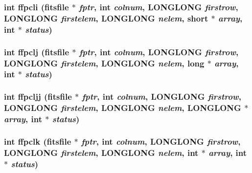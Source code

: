 \subsubsection{\setlength{\rightskip}{0pt plus 5cm}int ffpcli (\bf{fitsfile} $\ast$ {\em fptr}, int {\em colnum}, \bf{LONGLONG} {\em firstrow}, \bf{LONGLONG} {\em firstelem}, \bf{LONGLONG} {\em nelem}, short $\ast$ {\em array}, int $\ast$ {\em status})}\label{test_2shm__client_2fitsio_8h_097003985cb9d02ceced5a5744bfa0fc}


\subsubsection{\setlength{\rightskip}{0pt plus 5cm}int ffpclj (\bf{fitsfile} $\ast$ {\em fptr}, int {\em colnum}, \bf{LONGLONG} {\em firstrow}, \bf{LONGLONG} {\em firstelem}, \bf{LONGLONG} {\em nelem}, long $\ast$ {\em array}, int $\ast$ {\em status})}\label{test_2shm__client_2fitsio_8h_5792d2cdff6869df24d96769d29588bb}


\subsubsection{\setlength{\rightskip}{0pt plus 5cm}int ffpcljj (\bf{fitsfile} $\ast$ {\em fptr}, int {\em colnum}, \bf{LONGLONG} {\em firstrow}, \bf{LONGLONG} {\em firstelem}, \bf{LONGLONG} {\em nelem}, \bf{LONGLONG} $\ast$ {\em array}, int $\ast$ {\em status})}\label{test_2shm__client_2fitsio_8h_65ee3dc7c6f9893ec471ba73d3a9779d}


\subsubsection{\setlength{\rightskip}{0pt plus 5cm}int ffpclk (\bf{fitsfile} $\ast$ {\em fptr}, int {\em colnum}, \bf{LONGLONG} {\em firstrow}, \bf{LONGLONG} {\em firstelem}, \bf{LONGLONG} {\em nelem}, int $\ast$ {\em array}, int $\ast$ {\em status})}\label{test_2shm__client_2fitsio_8h_d4e01a4e0406be50e5e104f31f5c8fea}


